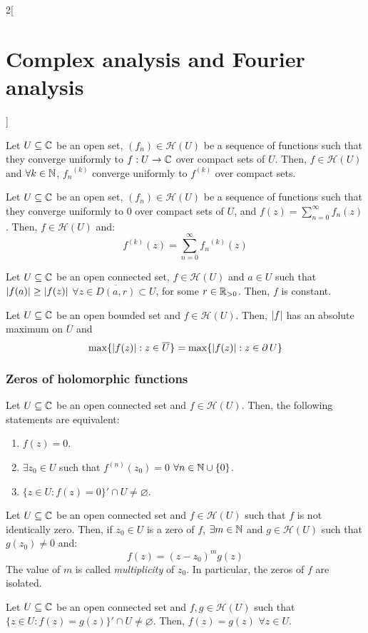 \documentclass[../../../main.tex]{subfiles}
\begin{document}
\begin{multicols}{2}[\section{Complex analysis and Fourier analysis}]
\begin{theorem}
  \end{theorem}
  \begin{theorem}
    Let $U\subseteq\mathbb{C}$ be an open set, $(f_n)\in\mathcal{H}(U)$ be a sequence of functions such that they converge uniformly to $f:U\rightarrow\mathbb{C}$ over compact sets of $U$. Then, $f\in\mathcal{H}(U)$ and $\forall k\in \mathbb{N}$, ${f_n}^{(k)}$ converge uniformly to $f^{(k)}$ over compact sets.
  \end{theorem}
  \begin{corollary}
    Let $U\subseteq\mathbb{C}$ be an open set, $(f_n)\in\mathcal{H}(U)$ be a sequence of functions such that they converge uniformly to 0 over compact sets of $U$, and $f(z)=\sum_{n=0}^\infty f_n(z)$. Then, $f\in\mathcal{H}(U)$ and: $$f^{(k)}(z)=\sum_{n=0}^\infty {f_n}^{(k)}(z)$$
  \end{corollary}
  \begin{theorem}
    Let $U\subseteq\mathbb{C}$ be an open connected set, $f\in\mathcal{H}(U)$ and $a\in U$ such that $\abs{f(a)}\geq \abs{f(z)}$ $\forall z\in \overline{D(a,r)}\subset U$, for some $r\in\mathbb{R}_{>0}$. Then, $f$ is constant.
  \end{theorem}
  \begin{corollary}
    Let $U\subseteq\mathbb{C}$ be an open bounded set and $f\in\mathcal{H}(U)$. Then, $\abs{f}$ has an absolute maximum on $\overline{U}$ and $$\max\{\abs{f(z)}:z\in\overline{U}\}=\max\{\abs{f(z)}:z\in\operatorname{\partial} U\}$$
  \end{corollary}
  \subsubsection{Zeros of holomorphic functions}
  \begin{theorem}
    Let $U\subseteq\mathbb{C}$ be an open connected set and $f\in\mathcal{H}(U)$. Then, the following statements are equivalent:
    \begin{enumerate}
      \item $f(z)=0$.
      \item $\exists z_0\in U$ such that $f^{(n)}(z_0)=0$ $\forall n\in\mathbb{N}\cup\{0\}$.
      \item ${\{z\in U:f(z)=0\}}'\cap U\ne\varnothing$.
    \end{enumerate}
  \end{theorem}
  \begin{corollary}
    Let $U\subseteq\mathbb{C}$ be an open connected set and $f\in\mathcal{H}(U)$ such that $f$ is not identically zero. Then, if $z_0\in U$ is a zero of $f$, $\exists m\in\mathbb{N}$ and $g\in\mathcal{H}(U)$ such that $g(z_0)\ne 0$ and: $$f(z)={(z-z_0)}^{m}g(z)$$ The value of $m$ is called \emph{multiplicity} of $z_0$. In particular, the zeros of $f$ are isolated.
  \end{corollary}
  \begin{theorem}
    Let $U\subseteq\mathbb{C}$ be an open connected set and $f,g\in\mathcal{H}(U)$ such that ${\{z\in U:f(z)=g(z)\}}'\cap U\ne\varnothing$. Then, $f(z)=g(z)$ $\forall z\in U$.
  \end{theorem}

\end{multicols}
\end{document}
